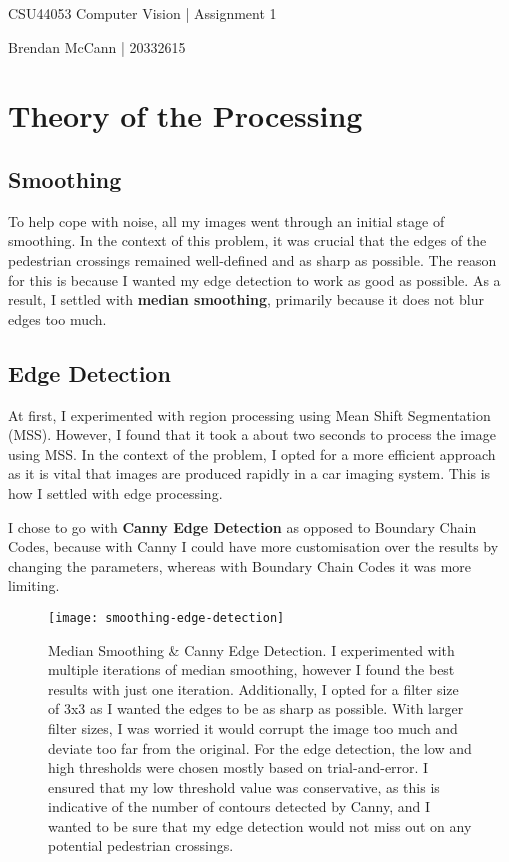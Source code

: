 \documentclass{article}  %
\begin{document}
	
	\begin{center}
		\begin{Large}
			CSU44053 Computer Vision | Assignment 1
			
			Brendan McCann | 20332615
		\end{Large}
	\end{center}
	
	\section{Theory of the Processing}
	
	\subsection{Smoothing}
	
	To help cope with noise, all my images went through an initial stage of smoothing. In the context of this problem, it was crucial that the edges of the pedestrian crossings remained well-defined and as sharp as possible. The reason for this is because I wanted my edge detection to work as good as possible. As a result, I settled with \textbf{median smoothing}, primarily because it does not blur edges too much.
	
	\subsection{Edge Detection}
	
	At first, I experimented with region processing using Mean Shift Segmentation (MSS). However, I found that it took a about two seconds to process the image using MSS. In the context of the problem, I opted for a more efficient approach as it is vital that images are produced rapidly in a car imaging system. This is how I settled with edge processing.
	
	I chose to go with \textbf{Canny Edge Detection} as opposed to Boundary Chain Codes, because with Canny I could have more customisation over the results by changing the parameters, whereas with Boundary Chain Codes it was more limiting.
	
	\begin{figure}[H]
		\centering
		\texttt{[image: smoothing-edge-detection]}
		\caption{Median Smoothing \& Canny Edge Detection. I experimented with multiple iterations of median smoothing, however I found the best results with just one iteration. Additionally, I opted for a filter size of 3x3 as I wanted the edges to be as sharp as possible. With larger filter sizes, I was worried it would corrupt the image too much and deviate too far from the original. For the edge detection, the low and high thresholds were chosen mostly based on trial-and-error. I ensured that my low threshold value was conservative, as this is indicative of the number of contours detected by Canny, and I wanted to be sure that my edge detection would not miss out on any potential pedestrian crossings.}
	\end{figure}
	
\end{document}
